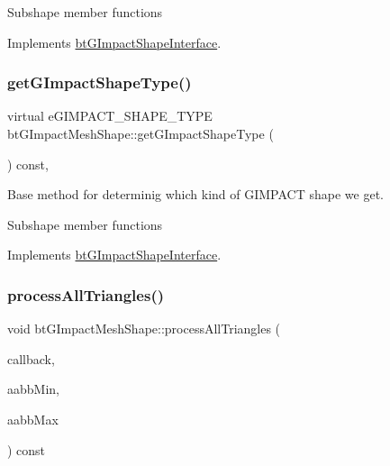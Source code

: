 Subshape member functions 

Implements \hyperlink{classbtGImpactShapeInterface_a25cacbe448997e3f8ec99cb2d4952859}{bt\+G\+Impact\+Shape\+Interface}.

\mbox{\label{classbtGImpactMeshShape_ac48641f3b35339f6de0716197bbbe302}} 
\subsubsection{\texorpdfstring{get\+G\+Impact\+Shape\+Type()}{getGImpactShapeType()}\hspace{0.1cm}{\footnotesize\ttfamily [2/2]}}
{\footnotesize\ttfamily virtual e\+G\+I\+M\+P\+A\+C\+T\+\_\+\+S\+H\+A\+P\+E\+\_\+\+T\+Y\+PE bt\+G\+Impact\+Mesh\+Shape\+::get\+G\+Impact\+Shape\+Type (\begin{DoxyParamCaption}{ }\end{DoxyParamCaption}) const\hspace{0.3cm}{\ttfamily [inline]}, {\ttfamily [virtual]}}



Base method for determinig which kind of G\+I\+M\+P\+A\+CT shape we get. 

Subshape member functions 

Implements \hyperlink{classbtGImpactShapeInterface_a25cacbe448997e3f8ec99cb2d4952859}{bt\+G\+Impact\+Shape\+Interface}.

\mbox{\label{classbtGImpactMeshShape_aa2963b35e88c0f423b4b7b10540a5f6b}} 
\subsubsection{\texorpdfstring{process\+All\+Triangles()}{processAllTriangles()}\hspace{0.1cm}{\footnotesize\ttfamily [1/2]}}
{\footnotesize\ttfamily void bt\+G\+Impact\+Mesh\+Shape\+::process\+All\+Triangles (\begin{DoxyParamCaption}\item[{\hyperlink{classbtTriangleCallback}{bt\+Triangle\+Callback} $\ast$}]{callback,  }\item[{const bt\+Vector3 \&}]{aabb\+Min,  }\item[{const bt\+Vector3 \&}]{aabb\+Max }\end{DoxyParamCaption}) const\hspace{0.3cm}{\ttfamily [virtual]}}



